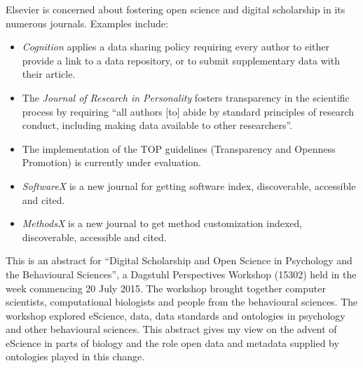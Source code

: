 \documentclass[a4paper,USenglish]{dagrep}
\begin{document}
{}
\license
Elsevier is concerned about fostering open science and digital scholarship in its numerous journals.  Examples include:
\begin{itemize}
\item \emph{Cognition} applies a data sharing policy requiring every author to either provide a link to a data repository, or to submit supplementary data with their article.
\item The \emph{Journal of Research in Personality} fosters transparency in the scientific process by requiring ``all authors [to] abide by standard principles of research conduct, including making data available to other researchers''.
\item The implementation of the TOP guidelines (Transparency and Openness Promotion) is currently under evaluation.
\item \emph{SoftwareX} is a new journal for getting software index, discoverable, accessible and cited.
\item \emph{MethodsX} is a new journal to get method customization indexed, discoverable, accessible and cited.
\end{itemize}

{}
\license

This is an abstract for ``Digital Scholarship and Open Science in Psychology and
the Behavioural Sciences'', a Dagstuhl Perspectives Workshop (15302) held in the
week commencing 20 July 2015. The workshop brought together computer scientists,
computational biologists and people from the behavioural sciences. The workshop
explored eScience, data, data standards and ontologies in psychology and other
behavioural sciences. This abstract gives my view on the advent of eScience in
parts of biology and the role open data and metadata supplied by ontologies
played in this change.
\end{document}
